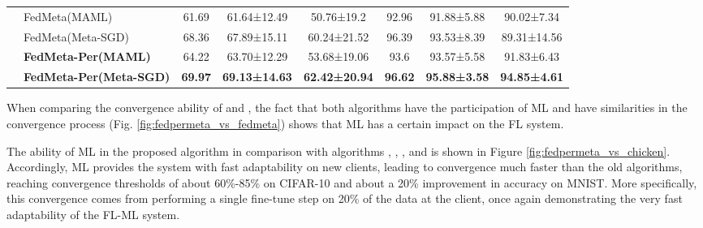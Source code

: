 \documentclass[runningheads]{llncs}
\begin{document}
\begin{table}[h]
{\begin{tabular}{c|l|ccc|ccc}
                         & FedMeta(MAML)                                                                                                      & 61.69          & 61.64±12.49          & 50.76±19.2           & 92.96                             & 91.88±5.88                        & 90.02±7.34                         \\
                         & FedMeta(Meta-SGD)                                                                                                  & 68.36          & 67.89±15.11          & 60.24±21.52          & 96.39                             & 93.53±8.39                        & 89.31±14.56                         \\
                         & \textbf{\textbf{FedMeta-Per(MAML)}}                                                                                & 64.22          & 63.70±12.29          & 53.68±19.06          & 93.6                              & 93.57±5.58                        & 91.83±6.43                         \\
                         & \textbf{\textbf{FedMeta-Per(Meta-SGD)}}                                                                            & \textbf{69.97} & \textbf{69.13±14.63} & \textbf{62.42±20.94} & \textbf{96.62}                    & \textbf{95.88±3.58}               & \textbf{94.85±4.61}                 \\
    \bottomrule
    \end{tabular}
    }
\end{table}

When comparing the convergence ability of  and , the fact that both algorithms have the participation of ML and have similarities in the convergence process (Fig. \ref{fig:fedpermeta_vs_fedmeta}) shows that ML has a certain impact on the FL system.

The ability of ML in the proposed algorithm in comparison with algorithms , , , and  is shown in Figure \ref{fig:fedpermeta_vs_chicken}. Accordingly, ML provides the system with fast adaptability on new clients, leading to  convergence much faster than the old algorithms, reaching convergence thresholds of about 60\%-85\% on CIFAR-10 and about a 20\% improvement in accuracy on MNIST. More specifically, this convergence comes from performing a single fine-tune step on 20\% of the data at the client, once again demonstrating the very fast adaptability of the FL-ML system.
\end{document}
